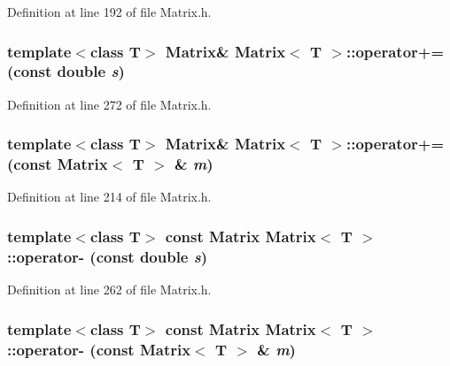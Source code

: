 Definition at line 192 of file Matrix.h.

\hypertarget{classMatrix_a54d2f788e4e209cfe472bbcbbbd6bc2d}{
\subsubsection[{operator+=}]{\setlength{\rightskip}{0pt plus 5cm}template$<$class T$>$ {\bf Matrix}\& {\bf Matrix}$<$ T $>$::operator+= (const double {\em s})}}
\label{classMatrix_a54d2f788e4e209cfe472bbcbbbd6bc2d}


Definition at line 272 of file Matrix.h.

\hypertarget{classMatrix_a480a72298ae1fc8443b0edfaa66d7c46}{
\subsubsection[{operator+=}]{\setlength{\rightskip}{0pt plus 5cm}template$<$class T$>$ {\bf Matrix}\& {\bf Matrix}$<$ T $>$::operator+= (const {\bf Matrix}$<$ T $>$ \& {\em m})}}
\label{classMatrix_a480a72298ae1fc8443b0edfaa66d7c46}


Definition at line 214 of file Matrix.h.

\hypertarget{classMatrix_a254817e151d338279aec5711b6cdf403}{
\subsubsection[{operator-\/}]{\setlength{\rightskip}{0pt plus 5cm}template$<$class T$>$ const {\bf Matrix} {\bf Matrix}$<$ T $>$::operator-\/ (const double {\em s})}}
\label{classMatrix_a254817e151d338279aec5711b6cdf403}


Definition at line 262 of file Matrix.h.

\hypertarget{classMatrix_a08e75978ea8288083ef36f53b4ac115d}{
\subsubsection[{operator-\/}]{\setlength{\rightskip}{0pt plus 5cm}template$<$class T$>$ const {\bf Matrix} {\bf Matrix}$<$ T $>$::operator-\/ (const {\bf Matrix}$<$ T $>$ \& {\em m})}}
\label{classMatrix_a08e75978ea8288083ef36f53b4ac115d}


